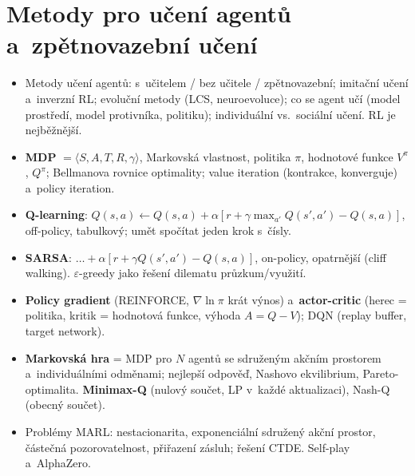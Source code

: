 \documentclass[11pt,a4paper]{article}
\theoremstyle{definition}
\begin{document}
\section{Metody pro učení agentů a~zpětnovazební učení}
\begin{itemize}
\item Metody učení agentů: s~učitelem / bez učitele / zpětnovazební; imitační učení
 a~inverzní RL; evoluční metody (LCS, neuroevoluce); co se agent učí (model prostředí,
 model protivníka, politiku); individuální vs.\ sociální učení. RL je nejběžnější.
\item \textbf{MDP} $= \langle S,A,T,R,\gamma\rangle$, Markovská vlastnost, politika $\pi$,
 hodnotové funkce $V^\pi$, $Q^\pi$; Bellmanova rovnice optimality; value iteration
 (kontrakce, konverguje) a~policy iteration.
\item \textbf{Q-learning}: $Q(s,a) \leftarrow Q(s,a) + \alpha[r + \gamma\max_{a'}Q(s',a') - Q(s,a)]$,
 off-policy, tabulkový; umět spočítat jeden krok s~čísly.
\item \textbf{SARSA}: $\dots + \alpha[r + \gamma Q(s',a') - Q(s,a)]$, on-policy, opatrnější
 (cliff walking). $\varepsilon$-greedy jako řešení dilematu průzkum/využití.
\item \textbf{Policy gradient} (REINFORCE, $\nabla \ln \pi$ krát výnos) a~\textbf{actor-critic}
 (herec = politika, kritik = hodnotová funkce, výhoda $A = Q - V$); DQN (replay buffer,
 target network).
\item \textbf{Markovská hra} = MDP pro $N$ agentů se sdruženým akčním prostorem
 a~individuálními odměnami; nejlepší odpověď, Nashovo ekvilibrium, Pareto-optimalita.
 \textbf{Minimax-Q} (nulový součet, LP v~každé aktualizaci), Nash-Q (obecný součet).
\item Problémy MARL: nestacionarita, exponenciální sdružený akční prostor, částečná
 pozorovatelnost, přiřazení zásluh; řešení CTDE. Self-play a~AlphaZero.
\end{itemize}
\end{document}
